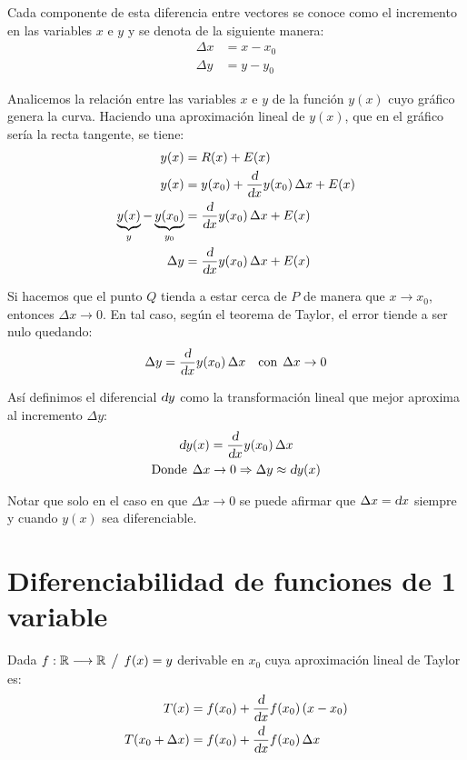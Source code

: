 \documentclass[a5paper,12pt,twoside]{book}
\begin{document}
Cada componente de esta diferencia entre vectores se conoce como el incremento en las variables $x$ e $y$ y se denota de la siguiente manera:
\begin{align*}
    \Delta x &= x-x_0
    \\
    \Delta y &= y-y_0
\end{align*}

Analicemos la relación entre las variables $x$ e $y$ de la función $y(x)$ cuyo gráfico genera la curva. Haciendo una aproximación lineal de $y(x)$, que en el gráfico sería la recta tangente, se tiene:
\begin{align*}
    y(x) &= R(x)+E(x)
    \\
    y(x) &= y(x_0) + \frac{\textsl{d}}{\textsl{d} x} y(x_0) \, \Delta x +E(x)
    \\
    \underbrace{y(x)}_y - \underbrace{y(x_0)}_{y_0} &= \frac{\textsl{d}}{\textsl{d} x} y(x_0) \, \Delta x +E(x)
    \\
    \Delta y &= \frac{\textsl{d}}{\textsl{d} x} y(x_0) \, \Delta x +E(x)
\end{align*}

Si hacemos que el punto $Q$ tienda a estar cerca de $P$ de manera que $x \to x_0$, entonces $\Delta x \to 0$. En tal caso, según el teorema de Taylor, el error tiende a ser nulo quedando:
\begin{equation*}
    \Delta y = \frac{\textsl{d}}{\textsl{d} x} y(x_0) \, \Delta x \quad \textrm{con} \hspace{1ex} \Delta x \to 0
\end{equation*}

Así definimos el diferencial $\textsl{d} y$ como la transformación lineal que mejor aproxima al incremento $\Delta y$:
\begin{gather*}
    \textsl{d} y(x) = \dfrac{\textsl{d}}{\textsl{d} x} y(x_0) \, \Delta x
    \\
    \textrm{Donde} \hspace{1ex} \Delta x \to 0 \Rightarrow \Delta y \approx \textsl{d} y(x)
\end{gather*}

Notar que solo en el caso en que $\Delta x \to 0$ se puede afirmar que $\Delta x = \textsl{d} x$ siempre y cuando $y(x)$ sea diferenciable.


\section{Diferenciabilidad de funciones de 1 variable}

Dada $f: \mathbb{R} \longrightarrow \mathbb{R} \hspace{1ex} \big/ \hspace{1ex} f(x)=y$ derivable en $x_0$ cuya aproximación lineal de Taylor es:
\begin{align*}
    T(x) &= f(x_0)+\frac{\textsl{d}}{\textsl{d} x} f(x_0) \left(x-x_0\right)
    \\
    T(x_0 + \Delta x) &= f(x_0)+\frac{\textsl{d}}{\textsl{d} x} f(x_0) \, \Delta x
\end{align*}
\end{document}
